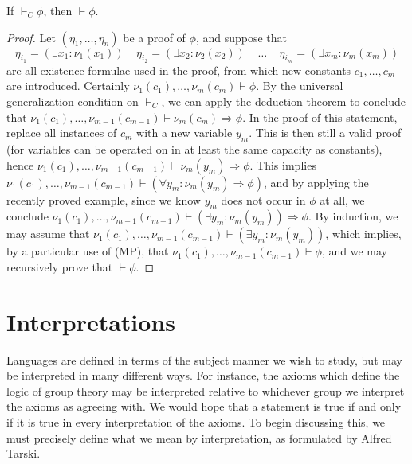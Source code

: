 \begin{theorem}
    If $\vdash_C \phi$, then $\vdash \phi$.
\end{theorem}
\begin{proof}
    Let $(\eta_1, \dots, \eta_n)$ be a proof of $\phi$, and suppose that
    \[ \eta_{i_1} = (\exists x_1: \nu_1(x_1))\ \ \ \ \ \eta_{i_2} = (\exists x_2: \nu_2(x_2))\ \ \ \ \ \dots\ \ \ \ \ \eta_{i_m} = (\exists x_m: \nu_m(x_m)) \]
    are all existence formulae used in the proof, from which new constants $c_1, \dots, c_m$ are introduced. Certainly $\nu_1(c_1), \dots, \nu_m(c_m) \vdash \phi$. By the universal generalization condition on $\vdash_C$, we can apply the deduction theorem to conclude that $\nu_1(c_1), \dots, \nu_{m-1}(c_{m-1}) \vdash \nu_m(c_m) \Rightarrow \phi$. In the proof of this statement, replace all instances of $c_m$ with a new variable $y_m$. This is then still a valid proof (for variables can be operated on in at least the same capacity as constants), hence $\nu_1(c_1), \dots, \nu_{m-1}(c_{m-1}) \vdash \nu_m(y_m) \Rightarrow \phi$. This implies $\nu_1(c_1), \dots, \nu_{m-1}(c_{m-1}) \vdash (\forall y_m: \nu_m(y_m) \Rightarrow \phi)$, and by applying the recently proved example, since we know $y_m$ does not occur in $\phi$ at all, we conclude $\nu_1(c_1), \dots, \nu_{m-1}(c_{m-1}) \vdash (\exists y_m: \nu_m(y_m)) \Rightarrow \phi$. By induction, we may assume that $\nu_1(c_1), \dots, \nu_{m-1}(c_{m-1}) \vdash (\exists y_m: \nu_m(y_m))$, which implies, by a particular use of (MP), that $\nu_1(c_1), \dots, \nu_{m-1}(c_{m-1}) \vdash \phi$, and we may recursively prove that $\vdash \phi$.
\end{proof}







\section{Interpretations}

Languages are defined in terms of the subject manner we wish to study, but may be interpreted in many different ways. For instance, the axioms which define the logic of group theory may be interpreted relative to whichever group we interpret the axioms as agreeing with. We would hope that a statement is true if and only if it is true in every interpretation of the axioms. To begin discussing this, we must precisely define what we mean by interpretation, as formulated by Alfred Tarski.

